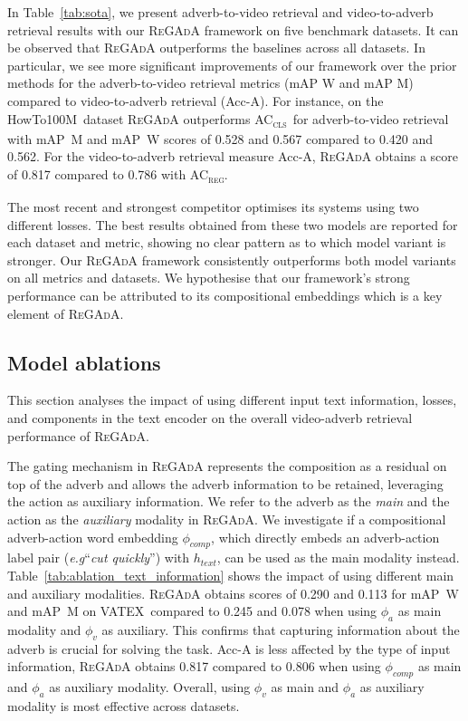 \documentclass[table]{bmvc2k}
\def\eg{\emph{e.g}\bmvaOneDot}
\newcommand{\modelName}{\textsc{ReGAdA}\xspace}
\newcommand{\howto}{HowTo100M}
\newcommand{\vatex}{VATEX}
\newcommand{\accls}{AC\textsubscript{\textsc{cls}}}
\newcommand{\acreg}{AC\textsubscript{\textsc{reg}}}
\begin{document}
In Table~\ref{tab:sota}, we present adverb-to-video retrieval and video-to-adverb retrieval results with our \modelName framework on five benchmark datasets. It can be observed that \modelName outperforms the baselines across all datasets. In particular, we see more significant improvements of our framework over the prior methods for the adverb-to-video retrieval metrics (mAP W and mAP M) compared to video-to-adverb retrieval (Acc-A). 
For instance, on the \howto\ dataset \modelName outperforms \accls\ for adverb-to-video retrieval with mAP~M and mAP~W scores of 0.528 and 0.567 compared to 0.420 and 0.562. For the video-to-adverb retrieval measure Acc-A, \modelName obtains a score of 0.817 compared to 0.786 with \acreg. 

The most recent and strongest competitor \cite{moltisanti2023learning} optimises its systems using two different losses. The best results obtained from these two models are reported for each dataset and metric, showing no clear pattern as to which model variant is stronger.
Our \modelName framework consistently outperforms both model variants~\cite{moltisanti2023learning} on all metrics and datasets. We hypothesise that our framework's strong performance can be attributed to its compositional embeddings which is a key element of \modelName.
 
\subsection{Model ablations} \label{ablations}
This section analyses the impact of using different input text information, losses, and components in the text encoder on the overall video-adverb retrieval performance of \modelName.

The gating mechanism in \modelName represents the composition as a residual on top of the adverb and allows the adverb information to be retained, leveraging the action as auxiliary information.
We refer to the adverb as the \textit{main} and the action as the \textit{auxiliary} modality in \modelName.
We investigate if a compositional adverb-action word embedding $\phi_{comp}$, which directly embeds an adverb-action label pair (\eg ``\textit{cut quickly}'') with $h_{text}$, can be used as the main modality instead.
Table~\ref{tab:ablation_text_information} shows the impact of using different main and auxiliary modalities. 
\modelName obtains scores of 0.290 and 0.113 for mAP~W and mAP~M on \vatex\, compared to 0.245 and 0.078 when using $\phi_a$ as main modality and $\phi_v$ as auxiliary.
This confirms that capturing information about the adverb is crucial for solving the task.
Acc-A is less affected by the type of input information, \modelName obtains 0.817 compared to 0.806 when using $\phi_{comp}$ as main and $\phi_a$ as auxiliary modality. Overall, using $\phi_v$ as main and $\phi_a$ as auxiliary modality is most effective across datasets. 
\end{document}
